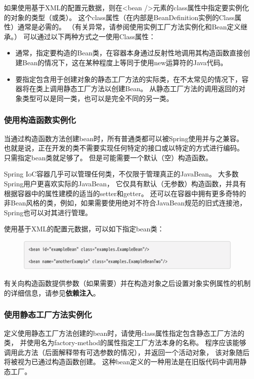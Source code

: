 如果使用基于XML的配置元数据，则在<bean />元素的class属性中指定要实例化的对象的类型（或类）。 
这个class属性（在内部是BeanDefinition实例的Class属性）通常是必需的。 
（有关异常，请参阅使用实例工厂方法实例化和Bean定义继承。）
可以通过以下两种方式之一使用Class属性：

\begin{itemize}
    \item 通常，指定要构造的Bean类，在容器本身通过反射性地调用其构造函数直接创建Bean的情况下，这在某种程度上等同于使用new运算符的Java代码。
    \item 要指定包含用于创建对象的静态工厂方法的实际类，在不太常见的情况下，容器将在类上调用静态工厂方法以创建Bean。 从静态工厂方法的调用返回的对象类型可以是同一类，也可以是完全不同的另一类。
\end{itemize}

\subsubsection{使用构造函数实例化}
当通过构造函数方法创建bean时，所有普通类都可以被Spring使用并与之兼容。 
也就是说，正在开发的类不需要实现任何特定的接口或以特定的方式进行编码。 
只需指定bean类就足够了。 但是可能需要一个默认（空）构造函数。

Spring IoC容器几乎可以管理任何类，不仅限于管理真正的JavaBean。 
大多数Spring用户更喜欢实际的JavaBean，
它仅具有默认（无参数）构造函数，并具有根据容器中的属性建模的适当的setter和getter。 
还可以在容器中拥有更多奇特的非Bean风格的类，例如，如果需要使用绝对不符合JavaBean规范的旧式连接池，
Spring也可以对其进行管理。

使用基于XML的配置元数据，可以如下指定bean类：

\begin{figure}[ht]
    \centering
    \includegraphics[width=1\linewidth]{./Figure/IMG_code_14.png}
\end{figure}

有关向构造函数提供参数（如果需要）并在构造对象之后设置对象实例属性的机制的详细信息，请参见\textbf{依赖注入}。

\subsubsection{使用静态工厂方法实例化}
定义使用静态工厂方法创建的bean时，请使用class属性指定包含静态工厂方法的类，
并使用名为factory-method的属性指定工厂方法本身的名称。 
程序应该能够调用此方法（后面解释带有可选参数的情况），并返回一个活动对象，
该对象随后将被视为已通过构造函数创建。 
这种bean定义的一种用法是在旧版代码中调用静态工厂。

